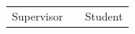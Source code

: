 \documentclass[12pt]{scrartcl}
\begin{document}
\newpage
{%
\renewcommand{\bibfont}{\normalfont\small}
\setlength{\biblabelsep}{5pt}
\setlength{\bibitemsep}{0.5\baselineskip plus 0.5\baselineskip} %
\setcounter{biburllcpenalty}{9000}
\setcounter{biburlucpenalty}{9999}
\printbibliography%
}

\null\vfill

\begin{center}
	\begin{tabular}{l p{} r}
		\cline{1-1} \cline{3-3}
		\begin{minipage}[t]{0.4\textwidth}
			\centering
			\vspace{0cm}Supervisor
		\end{minipage}
		&
		\begin{minipage}[t]{0.2\textwidth}
		\end{minipage}
		&
		\begin{minipage}[t]{0.4\textwidth}
			\centering
			\vspace{0cm}Student
		\end{minipage}
	\end{tabular}
\end{center}
\end{document}
